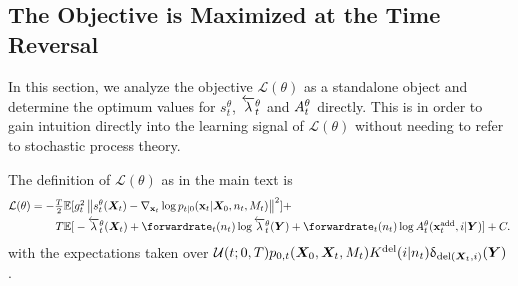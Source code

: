 \subsection{The Objective is Maximized at the Time Reversal}
\label{sec:tddm-ObjTimeRevProof}

\newcommand{\intxz}{\sum_{n_0=1}^N \int_{\rvx_0 \in \mathbb{R}^{n_0 d}}}

In this section, we analyze the objective $\mathcal{L}(\theta)$ as a standalone object and determine the optimum values for $s_t^\theta$, $\overleftarrow{\lambda}_t^\theta$ and $A_t^\theta$ directly. This is in order to gain intuition directly into the learning signal of $\mathcal{L}(\theta)$ without needing to refer to stochastic process theory.

The definition of $\mathcal{L}(\theta)$ as in the main text is
\begin{align}
    \mathcal{L}(\theta) = \textstyle -\frac{T}{2} \mathbb{E}[&\textstyle  \diffcoeff_t^2 \norm{s_t^\theta(\mX_t) - \nabla_{\rvx_t} \log p_{t|0}(\rvx_t | \mX_0, n_t, M_t)   }^2 ] + \\
    T \mathbb{E} [&\textstyle  - \backwardrate_{t}^\theta(\mX_t) + \forwardrate_t (n_t) \log \backwardrate_{t}^\theta(\mY) + \forwardrate_t(n_t) \log \autonet_{t}^\theta(\xadd_t, i | \mY) ] + C.
\end{align}
with the expectations taken over $\mathcal{U}(t; 0, T) p_{0,t}({\bm{X}}_0, {\bm{X}}_t, M_t) K^{\textup{del}}(i | n_t) \updelta_{\textup{del}({\bm{X}}_t, i)} ({\bm{Y}})$.

